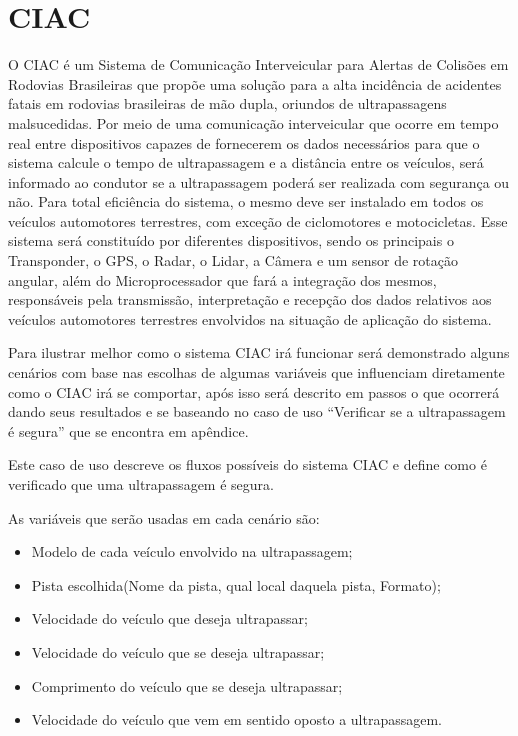 \chapter{CIAC}

O CIAC é um Sistema de Comunicação Interveicular para Alertas de Colisões em Rodovias Brasileiras que propõe uma solução para a alta incidência de acidentes fatais em rodovias brasileiras de mão dupla, oriundos de ultrapassagens malsucedidas. Por meio de uma comunicação interveicular que ocorre em tempo real entre dispositivos capazes de fornecerem os dados necessários para que o sistema calcule o tempo de ultrapassagem e a distância entre os veículos, será informado ao condutor se a ultrapassagem poderá ser realizada com segurança ou não. Para total eficiência do sistema, o mesmo deve ser instalado em todos os veículos automotores terrestres, com exceção de ciclomotores e motocicletas.
Esse sistema será constituído por diferentes dispositivos, sendo os principais o Transponder, o GPS, o Radar, o Lidar, a Câmera e um sensor de rotação angular, além do Microprocessador que fará a integração dos mesmos, responsáveis pela transmissão, interpretação e recepção dos dados relativos aos veículos automotores terrestres envolvidos na situação de aplicação do sistema.

Para ilustrar melhor como o sistema CIAC irá funcionar será demonstrado alguns cenários com base nas escolhas de algumas variáveis que influenciam diretamente como o CIAC irá se comportar, após isso será descrito em passos o que ocorrerá dando seus resultados e se baseando no caso de uso “Verificar se a ultrapassagem é segura” que se encontra em apêndice. 

Este caso de uso descreve os fluxos possíveis do sistema CIAC e define como é verificado que uma ultrapassagem é segura. 

As variáveis que serão usadas em cada cenário são:

\begin{itemize}
	\item Modelo de cada veículo envolvido na ultrapassagem;
	\item Pista escolhida(Nome da pista, qual local daquela pista, Formato);
	\item Velocidade do veículo que deseja ultrapassar;
	\item Velocidade do veículo que se deseja ultrapassar;
	\item Comprimento do veículo que se deseja ultrapassar;
	\item Velocidade do veículo que vem em sentido oposto a ultrapassagem.
\end{itemize}


